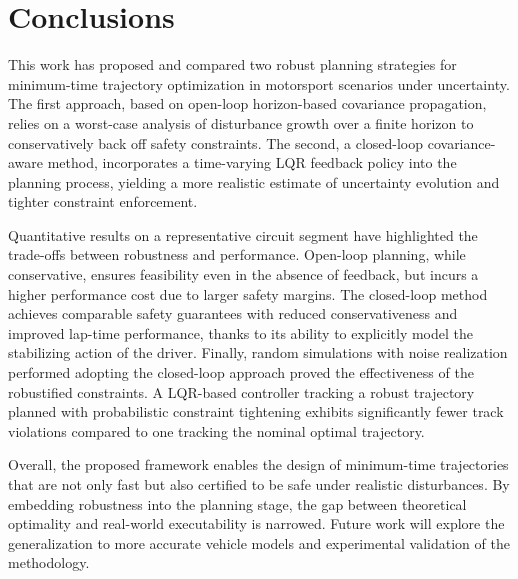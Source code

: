 \section{Conclusions} 
\label{sec:conclusions}

This work has proposed and compared two robust planning strategies for minimum-time trajectory optimization in motorsport scenarios under uncertainty. The first approach, based on open-loop horizon-based covariance propagation, relies on a worst-case analysis of disturbance growth over a finite horizon to conservatively back off safety constraints. The second, a closed-loop covariance-aware method, incorporates a time-varying LQR feedback policy into the planning process, yielding a more realistic estimate of uncertainty evolution and tighter constraint enforcement.

Quantitative results on a representative circuit segment have highlighted the trade-offs between robustness and performance. Open-loop planning, while conservative, ensures feasibility even in the absence of feedback, but incurs a higher performance cost due to larger safety margins. The closed-loop method achieves comparable safety guarantees with reduced conservativeness and improved lap-time performance, thanks to its ability to explicitly model the stabilizing action of the driver. 
Finally, random simulations with noise realization performed adopting the closed-loop approach proved the effectiveness of the robustified constraints. A LQR-based controller tracking a robust trajectory planned with probabilistic constraint tightening exhibits significantly fewer track violations compared to one tracking the nominal optimal trajectory.

Overall, the proposed framework enables the design of minimum-time trajectories that are not only fast but also certified to be safe under realistic disturbances. By embedding robustness into the planning stage, the gap between theoretical optimality and real-world executability is narrowed. Future work will explore the generalization to more accurate vehicle models and experimental validation of the methodology.